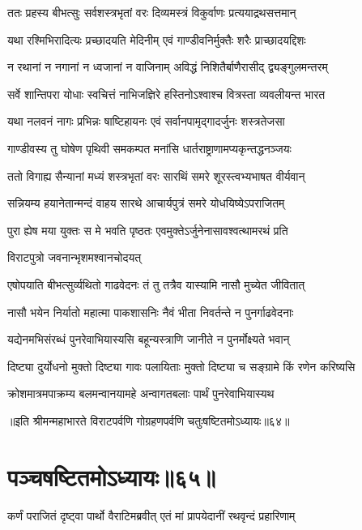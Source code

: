 \twolineshloka
{ततः प्रहस्य बीभत्सुः सर्वशस्त्रभृतां वरः}
{दिव्यमस्त्रं विकुर्वाणः प्रत्ययाद्रथसत्तमान्}


\twolineshloka
{यथा रश्मिभिरादित्यः प्रच्छादयति मेदिनीम्}
{एवं गाण्डीवनिर्मुक्तैः शरैः प्राच्छादयद्दिशः}


\twolineshloka
{न रथानां न नगानां न ध्वजानां न वाजिनाम्}
{अविद्धं निशितैर्बाणैरासीद् द्व्यङ्गुलमन्तरम्}


\twolineshloka
{सर्वे शान्तिपरा योधाः स्वचित्तं नाभिजज्ञिरे}
{हस्तिनोऽश्वाश्च वित्रस्ता व्यवलीयन्त भारत}


\twolineshloka
{यथा नलवनं नागः प्रभिन्नः षाष्टिहायनः}
{एवं सर्वानपामृद्गादर्जुनः शस्त्रतेजसा}


\twolineshloka
{गाण्डीवस्य तु घोषेण पृथिवी समकम्पत}
{मनांसि धार्तराष्ट्राणामप्यकृन्तद्धनञ्जयः}


\twolineshloka
{ततो विगाह्य सैन्यानां मध्यं शस्त्रभृतां वरः}
{सारथिं समरे शूरस्त्वभ्यभाषत वीर्यवान्}


\twolineshloka
{सन्नियम्य हयानेतान्मन्दं वाहय सारथे}
{आचार्यपुत्रं समरे योधयिष्येऽपराजितम्}


\twolineshloka
{पुरा ह्येष मया युक्तः स मे भवति पृष्ठतः}
{एवमुक्तेऽर्जुनेनासावश्वत्थामरथं प्रति}


\onelineshloka
{विराटपुत्रो जवनान्भृशमश्वानचोदयत्}




\twolineshloka
{एषोपयाति बीभत्सुर्व्यथितो गाढवेदनः}
{तं तु तत्रैव यास्यामि नासौ मुच्येत जीवितात्}




\twolineshloka
{नासौ भयेन निर्यातो महात्मा पाकशासनिः}
{नैवं भीता निवर्तन्ते न पुनर्गाढवेदनाः}


\twolineshloka
{यद्येनमभिसंरब्धं पुनरेवाभियास्यसि}
{बहून्यस्त्राणि जानीते न पुनर्मोक्ष्यते भवान्}


\twolineshloka
{दिष्ट्या दुर्योधनो मुक्तो दिष्ट्या गावः पलायिताः}
{मुक्तो दिष्ट्या च सङ्ग्रामे किं रणेन करिष्यसि}


\twolineshloka
{क्रोशमात्रमपाक्रम्य बलमन्वानयामहे}
{अन्वागतबलाः पार्थं पुनरेवाभियास्यथ}

॥इति श्रीमन्महाभारते विराटपर्वणि गोग्रहणपर्वणि चतुःषष्टितमोऽध्यायः॥६४॥

\chapter{पञ्चषष्टितमोऽध्यायः॥६५॥}

\twolineshloka
{कर्णं पराजितं दृष्ट्वा पार्थो वैराटिमब्रवीत्}
{एतं मां प्रापयेदानीं रथवृन्दं प्रहारिणाम्}


